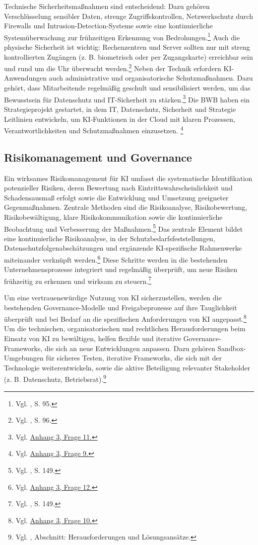 \documentclass[
    12pt, 
    a4paper,
    ]{scrartcl} %
\begin{document}
Technische Sicherheitsmaßnahmen sind entscheidend: Dazu gehören Verschlüsselung sensibler Daten, strenge Zugriffskontrollen, Netzwerkschutz durch Firewalls und Intrusion-Detection-Systeme sowie eine kontinuierliche Systemüberwachung zur frühzeitigen Erkennung von Bedrohungen.\footnote{Vgl. \cite{S_Fabarius2023}, S. 95.} Auch die physische Sicherheit ist wichtig: Rechenzentren und Server sollten nur mit streng kontrollierten Zugängen (z. B. biometrisch oder per Zugangskarte) erreichbar sein und rund um die Uhr überwacht werden.\footnote{Vgl. \cite{S_Fabarius2023}, S. 96.}
Neben der Technik erfordern KI-Anwendungen auch administrative und organisatorische Schutzmaßnahmen. Dazu gehört, dass Mitarbeitende regelmäßig geschult und sensibilisiert werden, um das Bewusstsein für Datenschutz und IT-Sicherheit zu stärken.\footnote{Vgl. \hyperref[sec:Anhang3]{Anhang 3, Frage 11.}} Die BWB haben ein Strategieprojekt gestartet, in dem IT, Datenschutz, Sicherheit und Strategie Leitlinien entwickeln, um KI-Funktionen in der Cloud mit klaren Prozessen, Verantwortlichkeiten und Schutzmaßnahmen einzusetzen. \footnote{Vgl. \hyperref[sec:Anhang3]{Anhang 3, Frage 9.}}

\subsection{Risikomanagement und Governance}

Ein wirksames Risikomanagement für KI umfasst die systematische Identifikation potenzieller Risiken, deren Bewertung nach Eintrittswahrscheinlichkeit und Schadensausmaß erfolgt sowie die Entwicklung und Umsetzung geeigneter Gegenmaßnahmen. Zentrale Methoden sind die Risikoanalyse, Risikobewertung, Risikobewältigung, klare Risikokommunikation sowie die kontinuierliche Beobachtung und Verbesserung der Maßnahmen.\footnote{Vgl. \cite{S_Fabarius2023}, S. 149.} Das zentrale Element bildet eine kontinuierliche Risikoanalyse, in der Schutzbedarfsfeststellungen, Datenschutzfolgenabschätzungen und ergänzende KI-spezifische Rahmenwerke miteinander verknüpft werden.\footnote{Vgl. \hyperref[sec:Anhang3]{Anhang 3, Frage 12.}} Diese Schritte werden in die bestehenden Unternehmensprozesse integriert und regelmäßig überprüft, um neue Risiken frühzeitig zu erkennen und wirksam zu steuern.\footnote{Vgl. \cite{S_Fabarius2023}, S. 149.}

Um eine vertrauenswürdige Nutzung von KI sicherzustellen, werden die bestehenden Governance-Modelle und Freigabeprozesse auf ihre Tauglichkeit überprüft und bei Bedarf an die spezifischen Anforderungen von KI angepasst.\footnote{Vgl. \hyperref[sec:Anhang3]{Anhang 3, Frage 10.}} Um die technischen, organisatorischen und rechtlichen Herausforderungen beim Einsatz von KI zu bewältigen, helfen flexible und iterative Governance-Frameworks, die sich an neue Entwicklungen anpassen. Dazu gehören Sandbox-Umgebungen für sicheres Testen, iterative Frameworks, die sich mit der Technologie weiterentwickeln, sowie die aktive Beteiligung relevanter Stakeholder (z. B. Datenschutz, Betriebsrat).\footnote{Vgl. \cite{S_Cegos2025}, Abschnitt: Herausforderungen und Lösungsansätze.}
\end{document}
